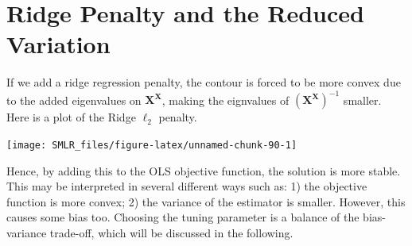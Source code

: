 \documentclass[
]{book}
\theoremstyle{definition}
\theoremstyle{definition}
\theoremstyle{definition}
\theoremstyle{definition}
\theoremstyle{remark}
\begin{document}
\hypertarget{ridge-penalty-and-the-reduced-variation}{%
\section{Ridge Penalty and the Reduced Variation}\label{ridge-penalty-and-the-reduced-variation}}

If we add a ridge regression penalty, the contour is forced to be more convex due to the added eigenvalues on \(\mathbf{X}^\mathbf{X}\), making the eignvalues of \((\mathbf{X}^\mathbf{X})^{-1}\) smaller. Here is a plot of the Ridge \(\ell_2\) penalty.

\begin{center}\texttt{[image: SMLR\_files/figure-latex/unnamed-chunk-90-1]} \end{center}

Hence, by adding this to the OLS objective function, the solution is more stable. This may be interpreted in several different ways such as: 1) the objective function is more convex; 2) the variance of the estimator is smaller. However, this causes some bias too. Choosing the tuning parameter is a balance of the bias-variance trade-off, which will be discussed in the following.
\end{document}

